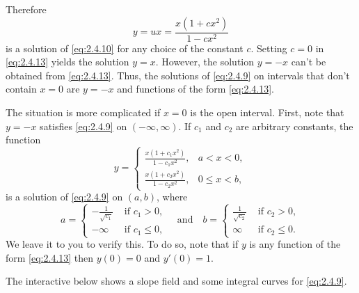 \documentclass{ximera}
\begin{document}
\begin{example}
\begin{explanation}
  

Therefore
\begin{equation} \label{eq:2.4.13}
y=ux=\frac{x(1+cx^2)}{1-cx^2}
\end{equation}
is a solution of \eqref{eq:2.4.10} for any choice of the constant $c$.
Setting $c=0$ in \eqref{eq:2.4.13} yields the solution $y=x$. However, the
solution $y=-x$ can't be obtained from \eqref{eq:2.4.13}. Thus, the
solutions of \eqref{eq:2.4.9} on intervals that don't contain $x=0$ are
$y=-x$ and functions of the form \eqref{eq:2.4.13}.

The situation is more complicated if $x=0$ is the open interval.
 First, note that $y=-x$ satisfies \eqref{eq:2.4.9}
on $(-\infty,\infty)$. If $c_1$ and $c_2$ are arbitrary constants,
 the function
\begin{equation} \label{eq:2.4.14}
y=\left\{\begin{array}{ll} \frac{x(1+c_1x^2)}{1-c_1x^2},&a<x<0,\\
\frac{x(1+c_2x^2)}{1-c_2x^2},&0\leq x<b,
 \end{array}\right.
\end{equation}
is a solution of \eqref{eq:2.4.9} on $(a,b)$, where
$$
a=\left\{\begin{array}{cl}-\frac{1}{\sqrt{c_1}}&\text{ if }c_1>0,\\
-\infty&\text{ if }c_1\leq 0,
\end{array}\right. \quad\text{and}\quad
b=\left\{\begin{array}{cl}\frac{1}{\sqrt{c_2}}&\text{ if }c_2>0,\\
\infty&\text{ if }c_2\leq 0.
\end{array}\right.
$$
We leave it to you to verify this. To do so, note that if $y$ is
any function of the form \eqref{eq:2.4.13} then $y(0)=0$ and $y'(0)=1$.


The interactive below shows a slope field and some integral curves
for \eqref{eq:2.4.9}.

\begin{center}
\end{center}


\end{explanation}
\end{example}
\end{document}
